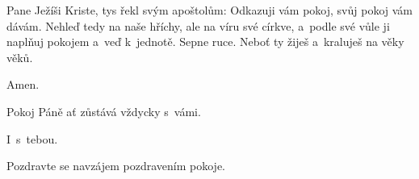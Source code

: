 Pane Ježíši Kriste, tys řekl svým apoštolům: Odkazuji vám pokoj, svůj pokoj vám dávám. Nehleď tedy na naše hříchy, ale na víru své církve, a~podle své vůle ji naplňuj pokojem a~veď k~jednotě. Sepne ruce. Neboť ty žiješ a~kraluješ na věky věků.

\Rbardot{} Amen.

\Vbardot{} Pokoj Páně ať zůstává vždycky s~vámi.

\Rbardot{} I~s~tebou.

\Vbardot{} Pozdravte se navzájem pozdravením pokoje.
